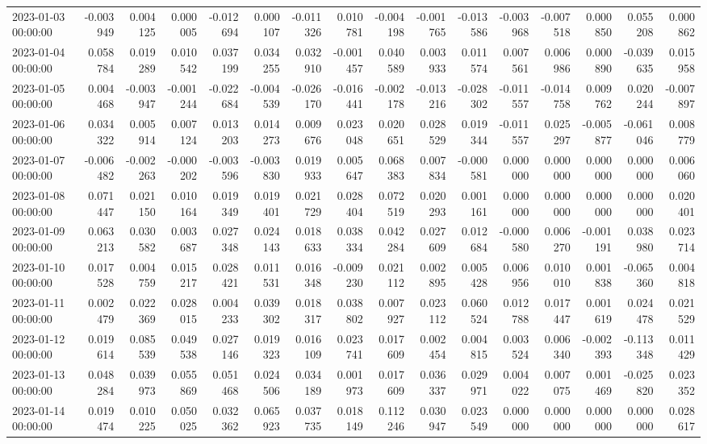\begin{tabular}{lrrrrrrrrrrrrrrr}
2023-01-03 00:00:00 & -0.003949 & 0.004125 & 0.000005 & -0.012694 & 0.000107 & -0.011326 & 0.010781 & -0.004198 & -0.001765 & -0.013586 & -0.003968 & -0.007518 & 0.000850 & 0.055208 & 0.000862 \\
2023-01-04 00:00:00 & 0.058784 & 0.019289 & 0.010542 & 0.037199 & 0.034255 & 0.032910 & -0.001457 & 0.040589 & 0.003933 & 0.011574 & 0.007561 & 0.006986 & 0.000890 & -0.039635 & 0.015958 \\
2023-01-05 00:00:00 & 0.004468 & -0.003947 & -0.001244 & -0.022684 & -0.004539 & -0.026170 & -0.016441 & -0.002178 & -0.013216 & -0.028302 & -0.011557 & -0.014758 & 0.009762 & 0.020244 & -0.007897 \\
2023-01-06 00:00:00 & 0.034322 & 0.005914 & 0.007124 & 0.013203 & 0.014273 & 0.009676 & 0.023048 & 0.020651 & 0.028529 & 0.019344 & -0.011557 & 0.025297 & -0.005877 & -0.061046 & 0.008779 \\
2023-01-07 00:00:00 & -0.006482 & -0.002263 & -0.000202 & -0.003596 & -0.003830 & 0.019933 & 0.005647 & 0.068383 & 0.007834 & -0.000581 & 0.000000 & 0.000000 & 0.000000 & 0.000000 & 0.006060 \\
2023-01-08 00:00:00 & 0.071447 & 0.021150 & 0.010164 & 0.019349 & 0.019401 & 0.021729 & 0.028404 & 0.072519 & 0.020293 & 0.001161 & 0.000000 & 0.000000 & 0.000000 & 0.000000 & 0.020401 \\
2023-01-09 00:00:00 & 0.063213 & 0.030582 & 0.003687 & 0.027348 & 0.024143 & 0.018633 & 0.038334 & 0.042284 & 0.027609 & 0.012684 & -0.000580 & 0.006270 & -0.001191 & 0.038980 & 0.023714 \\
2023-01-10 00:00:00 & 0.017528 & 0.004759 & 0.015217 & 0.028421 & 0.011531 & 0.016348 & -0.009230 & 0.021112 & 0.002895 & 0.005428 & 0.006956 & 0.010010 & 0.001838 & -0.065360 & 0.004818 \\
2023-01-11 00:00:00 & 0.002479 & 0.022369 & 0.028015 & 0.004233 & 0.039302 & 0.018317 & 0.038802 & 0.007927 & 0.023112 & 0.060524 & 0.012788 & 0.017447 & 0.001619 & 0.024478 & 0.021529 \\
2023-01-12 00:00:00 & 0.019614 & 0.085539 & 0.049538 & 0.027146 & 0.019323 & 0.016109 & 0.023741 & 0.017609 & 0.002454 & 0.004815 & 0.003524 & 0.006340 & -0.002393 & -0.113348 & 0.011429 \\
2023-01-13 00:00:00 & 0.048284 & 0.039973 & 0.055869 & 0.051468 & 0.024506 & 0.034189 & 0.001973 & 0.017609 & 0.036337 & 0.029971 & 0.004022 & 0.007075 & 0.001469 & -0.025820 & 0.023352 \\
2023-01-14 00:00:00 & 0.019474 & 0.010225 & 0.050025 & 0.032362 & 0.065923 & 0.037735 & 0.018149 & 0.112246 & 0.030947 & 0.023549 & 0.000000 & 0.000000 & 0.000000 & 0.000000 & 0.028617 \\

\end{tabular}

